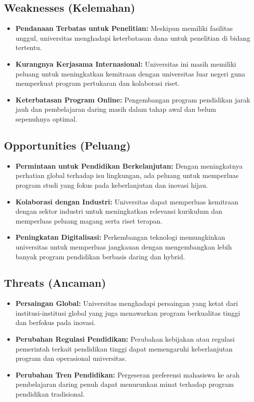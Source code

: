 \subsection{Weaknesses (Kelemahan)}
\begin{itemize}
	\item \textbf{Pendanaan Terbatas untuk Penelitian:} Meskipun memiliki fasilitas unggul, universitas menghadapi keterbatasan dana untuk penelitian di bidang tertentu.
	\item \textbf{Kurangnya Kerjasama Internasional:} Universitas ini masih memiliki peluang untuk meningkatkan kemitraan dengan universitas luar negeri guna memperkuat program pertukaran dan kolaborasi riset.
	\item \textbf{Keterbatasan Program Online:} Pengembangan program pendidikan jarak jauh dan pembelajaran daring masih dalam tahap awal dan belum sepenuhnya optimal.
\end{itemize}

\subsection{Opportunities (Peluang)}
\begin{itemize}
	\item \textbf{Permintaan untuk Pendidikan Berkelanjutan:} Dengan meningkatnya perhatian global terhadap isu lingkungan, ada peluang untuk memperluas program studi yang fokus pada keberlanjutan dan inovasi hijau.
	\item \textbf{Kolaborasi dengan Industri:} Universitas dapat memperluas kemitraan dengan sektor industri untuk meningkatkan relevansi kurikulum dan memperluas peluang magang serta riset terapan.
	\item \textbf{Peningkatan Digitalisasi:} Perkembangan teknologi memungkinkan universitas untuk memperluas jangkauan dengan mengembangkan lebih banyak program pendidikan berbasis daring dan hybrid.
\end{itemize}

\subsection{Threats (Ancaman)}
\begin{itemize}
	\item \textbf{Persaingan Global:} Universitas menghadapi persaingan yang ketat dari institusi-institusi global yang juga menawarkan program berkualitas tinggi dan berfokus pada inovasi.
	\item \textbf{Perubahan Regulasi Pendidikan:} Perubahan kebijakan atau regulasi pemerintah terkait pendidikan tinggi dapat memengaruhi keberlanjutan program dan operasional universitas.
	\item \textbf{Perubahan Tren Pendidikan:} Pergeseran preferensi mahasiswa ke arah pembelajaran daring penuh dapat menurunkan minat terhadap program pendidikan tradisional.
\end{itemize}



